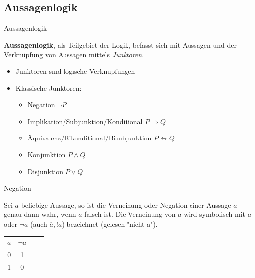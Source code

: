 \documentclass[12pt%
,aspectratio=169%
]{beamer}
\begin{document}
\subsection{Aussagenlogik}
\begin{frame}{Aussagenlogik}
\begin{definition}[Aussagenlogik]
\textbf{Aussagenlogik}, als Teilgebiet der Logik, befasst sich mit Aussagen und der Verknüpfung von Aussagen mittels \textit{Junktoren}.
\end{definition}
\begin{itemize}
	\item Junktoren sind logische Verknüpfungen
	\item Klassische Junktoren:
	\begin{itemize}
		\item Negation $\neg P$ 
		\item Implikation/Subjunktion/Konditional $P\Rightarrow Q$
		\item Äquivalenz/Bikonditional/Bisubjunktion $P\Leftrightarrow Q$
		\item Konjunktion $P\land Q$
		\item Disjunktion $P\lor Q$
	\end{itemize}
\end{itemize}
\cite{rautenberg2002einfuhrung}
\end{frame}

\begin{frame}{Negation}
\begin{definition}[Negation]
Sei $a$ beliebige Aussage, so ist die Verneinung oder Negation einer Aussage $a$ genau dann
wahr, wenn $a$ falsch ist. Die Verneinung von $a$ wird symbolisch mit $a$ oder $\neg a$ (auch $\overline{a}, !a$) bezeichnet (gelesen "nicht a").
\begin{center}
\begin{table}[]
\begin{tabular}{|c|c|ll}
\cline{1-2}
$a$ & $\neg a$ &  &  \\ \cline{1-2}
 0 & 1 &   \\ \cline{1-2}
 1 & 0 &   \\ \cline{1-2}
\end{tabular}
\end{table}
\end{center}
\end{definition}
\end{frame}
\end{document}

